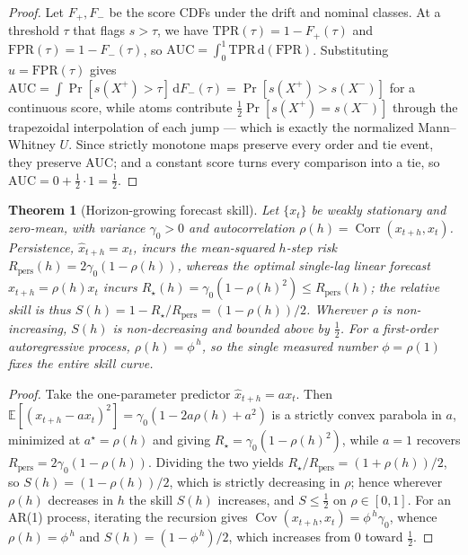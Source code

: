 \documentclass[
  aps,
  prresearch,
  reprint,
  amsmath,
  amssymb,
  nofootinbib,
  floatfix,
]{revtex4-2}
\newtheorem{theorem}{Theorem}
\begin{document}
\begin{proof}
Let $F_{+},F_{-}$ be the score CDFs under the drift and nominal classes. At a
threshold $\tau$ that flags $s>\tau$, we have $\mathrm{TPR}(\tau)=1-F_{+}(\tau)$ and
$\mathrm{FPR}(\tau)=1-F_{-}(\tau)$, so
$\mathrm{AUC}=\int_0^1\mathrm{TPR}\,\mathrm{d}(\mathrm{FPR})$. Substituting
$u=\mathrm{FPR}(\tau)$ gives
$\mathrm{AUC}=\int\Pr[s(X^{+})>\tau]\,\mathrm{d}F_{-}(\tau)=\Pr[s(X^{+})>s(X^{-})]$
for a continuous score, while atoms contribute $\tfrac12\Pr[s(X^{+})=s(X^{-})]$
through the trapezoidal interpolation of each jump --- which is exactly the
normalized Mann--Whitney $U$. Since strictly monotone maps preserve every order and
tie event, they preserve $\mathrm{AUC}$; and a constant score turns every comparison
into a tie, so $\mathrm{AUC}=0+\tfrac12\cdot1=\tfrac12$.
\end{proof}

\begin{theorem}[Horizon-growing forecast skill]
\label{thm:skill}
Let $\{x_t\}$ be weakly stationary and zero-mean, with variance $\gamma_0>0$ and
autocorrelation $\rho(h)=\operatorname{Corr}(x_{t+h},x_t)$. Persistence,
$\hat{x}_{t+h}=x_t$, incurs the mean-squared $h$-step risk
$R_{\mathrm{pers}}(h)=2\gamma_0(1-\rho(h))$, whereas the optimal single-lag linear
forecast $\hat{x}_{t+h}=\rho(h)x_t$ incurs
$R_\star(h)=\gamma_0(1-\rho(h)^2)\le R_{\mathrm{pers}}(h)$; the relative skill is thus
$S(h)=1-R_\star/R_{\mathrm{pers}}=(1-\rho(h))/2$. Wherever $\rho$ is non-increasing,
$S(h)$ is non-decreasing and bounded above by $\tfrac12$. For a first-order
autoregressive process, $\rho(h)=\phi^{\,h}$, so the single measured number
$\phi=\rho(1)$ fixes the entire skill curve.
\end{theorem}

\begin{proof}
Take the one-parameter predictor $\hat{x}_{t+h}=ax_t$. Then
$\mathbb{E}[(x_{t+h}-ax_t)^2]=\gamma_0(1-2a\rho(h)+a^2)$ is a strictly convex
parabola in $a$, minimized at $a^\star=\rho(h)$ and giving
$R_\star=\gamma_0(1-\rho(h)^2)$, while $a{=}1$ recovers
$R_{\mathrm{pers}}=2\gamma_0(1-\rho(h))$. Dividing the two yields
$R_\star/R_{\mathrm{pers}}=(1+\rho(h))/2$, so $S(h)=(1-\rho(h))/2$, which is strictly
decreasing in $\rho$; hence wherever $\rho(h)$ decreases in $h$ the skill $S(h)$
increases, and $S\le\tfrac12$ on $\rho\in[0,1]$. For an AR(1) process, iterating the
recursion gives $\operatorname{Cov}(x_{t+h},x_t)=\phi^{\,h}\gamma_0$, whence
$\rho(h)=\phi^{\,h}$ and $S(h)=(1-\phi^{\,h})/2$, which increases from $0$ toward
$\tfrac12$.
\end{proof}
\end{document}
